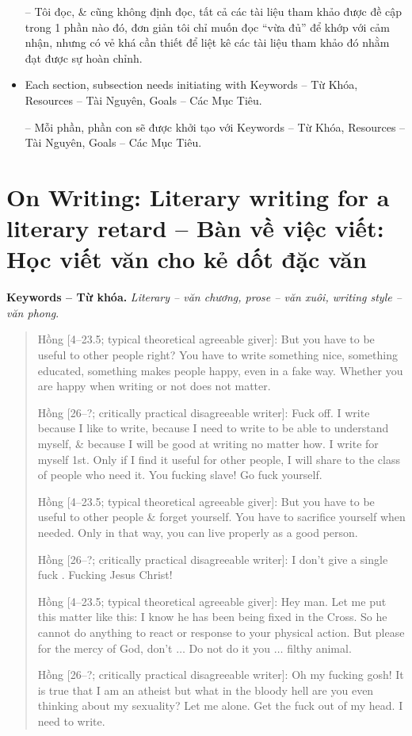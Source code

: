 \documentclass[12pt]{article}
\begin{document}
\begin{itemize}
	-- Tôi đọc, \& cũng không định đọc, tất cả các tài liệu tham khảo được đề cập trong 1 phần nào đó, đơn giản tôi chỉ muốn đọc ``vừa đủ'' để khớp với cảm nhận, nhưng có vẻ khá cần thiết để liệt kê các tài liệu tham khảo đó nhằm đạt được sự hoàn chỉnh.
	\item Each section, subsection needs initiating with {\sf Keywords -- Từ Khóa, Resources -- Tài Nguyên, Goals -- Các Mục Tiêu}.
	
	-- Mỗi phần, phần con sẽ được khởi tạo với {\sf Keywords -- Từ Khóa, Resources -- Tài Nguyên, Goals -- Các Mục Tiêu}.
\end{itemize}

\section{On Writing: Literary writing for a literary retard -- Bàn về việc viết: Học viết văn cho kẻ dốt đặc văn}
\textbf{\textsf{Keywords -- Từ khóa.}} {\it Literary -- văn chương, prose -- văn xuôi, writing style -- văn phong}.

\begin{quote}
	{\sf Hồng [4--23.5; typical theoretical agreeable giver]}: But you have to be useful to other people right? You have to write something nice, something educated, something makes people happy, even in a fake way. Whether you are happy when writing or not does not matter.
	
	{\sf Hồng [26--?; critically practical disagreeable writer]}: Fuck off. I write because I like to write, because I need to write to be able to understand myself, \& because I will be good at writing no matter how. I write for myself 1st. Only if I find it useful for other people, I will share to the class of people who need it. You fucking slave! Go fuck yourself.
	
	{\sf Hồng [4--23.5; typical theoretical agreeable giver]}: But you have to be useful to other people \& forget yourself. You have to sacrifice yourself when needed. Only in that way, you can live properly as a good person.
	
	{\sf Hồng [26--?; critically practical disagreeable writer]}: I don't give a single fuck \cite{Manson_giving_fuck,Manson_giving_fuck_vn}. Fucking Jesus Christ!
	
	{\sf Hồng [4--23.5; typical theoretical agreeable giver]}: Hey man. Let me put this matter like this: I know he has been being fixed in the Cross. So he cannot do anything to react or response to your physical action. But please for the mercy of God, don't $\ldots$ Do not do it you $\ldots$ filthy animal.
	
	{\sf Hồng [26--?; critically practical disagreeable writer]}: Oh my fucking gosh! It is true that I am an atheist but what in the bloody hell are you even thinking about my sexuality? Let me alone. Get the fuck out of my head. I need to write.
\end{quote}
\end{document}

